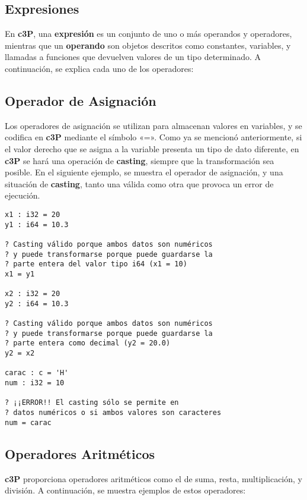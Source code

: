 \subsection{Expresiones}

En \textbf{c3P}, una \textbf{expresión} es un conjunto de uno o más operandos y operadores, mientras
que un \textbf{operando} son objetos descritos como constantes, variables, y llamadas a funciones que
devuelven valores de un tipo determinado. A continuación, se explica cada uno de los operadores:

\subsection{Operador de Asignación}

Los operadores de asignación se utilizan para almacenan valores en variables, y se codifica
en \textbf{c3P} mediante el símbolo «=». Como ya se mencionó anteriormente, si el valor
derecho que se asigna a la variable presenta un tipo de dato diferente, en \textbf{c3P} se
hará una operación de \textbf{casting}, siempre que la transformación sea posible. En el
siguiente ejemplo, se muestra el operador de asignación, y una situación de \textbf{casting},
tanto una válida como otra que provoca un error de ejecución.

\begin{verbatim}
x1 : i32 = 20
y1 : i64 = 10.3

? Casting válido porque ambos datos son numéricos
? y puede transformarse porque puede guardarse la
? parte entera del valor tipo i64 (x1 = 10)
x1 = y1

x2 : i32 = 20
y2 : i64 = 10.3

? Casting válido porque ambos datos son numéricos
? y puede transformarse porque puede guardarse la
? parte entera como decimal (y2 = 20.0)
y2 = x2

carac : c = 'H'
num : i32 = 10

? ¡¡ERROR!! El casting sólo se permite en
? datos numéricos o si ambos valores son caracteres
num = carac
\end{verbatim}

\subsection{Operadores Aritméticos}

\textbf{c3P} proporciona operadores aritméticos como el de suma, resta, multiplicación, y división.
A continuación, se muestra ejemplos de estos operadores:

